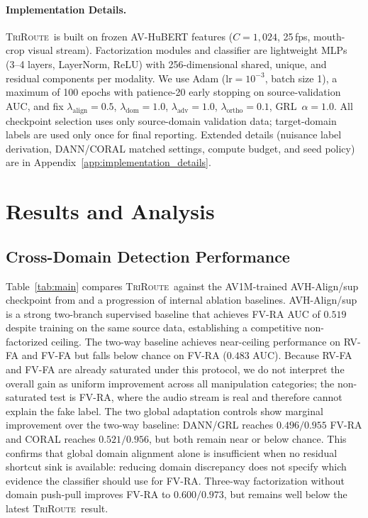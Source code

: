\documentclass{article}
\newcommand{\method}{\textsc{TriRoute}}
\begin{document}
\paragraph{Implementation Details.}
\method\ is built on frozen AV-HuBERT \citep{shi2022avhubert} features ($C=1{,}024$, 25\,fps, mouth-crop visual stream). Factorization modules and classifier are lightweight MLPs (3--4 layers, LayerNorm, ReLU) with 256-dimensional shared, unique, and residual components per modality. We use Adam ($\mathrm{lr}{=}10^{-3}$, batch size 1), a maximum of 100 epochs with patience-20 early stopping on source-validation AUC, and fix $\lambda_{\mathrm{align}}{=}0.5$, $\lambda_{\mathrm{dom}}{=}1.0$, $\lambda_{\mathrm{adv}}{=}1.0$, $\lambda_{\mathrm{ortho}}{=}0.1$, GRL~$\alpha{=}1.0$. All checkpoint selection uses only source-domain validation data; target-domain labels are used only once for final reporting. Extended details (nuisance label derivation, DANN/CORAL matched settings, compute budget, and seed policy) are in Appendix~\ref{app:implementation_details}.

\section{Results and Analysis}

\subsection{Cross-Domain Detection Performance}

Table~\ref{tab:main} compares \method\ against the AV1M-trained AVH-Align/sup checkpoint from \citet{smeu2025avhalign} and a progression of internal ablation baselines. AVH-Align/sup is a strong two-branch supervised baseline that achieves FV-RA AUC of $0.519$ despite training on the same source data, establishing a competitive non-factorized ceiling. The two-way baseline achieves near-ceiling performance on RV-FA and FV-FA but falls below chance on FV-RA ($0.483$ AUC). Because RV-FA and FV-FA are already saturated under this protocol, we do not interpret the overall gain as uniform improvement across all manipulation categories; the non-saturated test is FV-RA, where the audio stream is real and therefore cannot explain the fake label. The two global adaptation controls show marginal improvement over the two-way baseline: DANN/GRL reaches $0.496/0.955$ FV-RA and CORAL reaches $0.521/0.956$, but both remain near or below chance. This confirms that global domain alignment alone is insufficient when no residual shortcut sink is available: reducing domain discrepancy does not specify which evidence the classifier should use for FV-RA. Three-way factorization without domain push-pull improves FV-RA to $0.600/0.973$, but remains well below the latest \method\ result.
\end{document}
